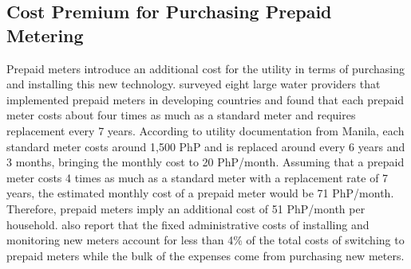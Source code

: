 \documentclass[12pt,table]{article}
\begin{document}
\begin{table}[H]
\end{table}





\subsection{Cost Premium for Purchasing Prepaid Metering}\label{appendix:prepaidcosts}

Prepaid meters introduce an additional cost for the utility in terms of purchasing and installing this new technology.  \cite{heymans2014limits} surveyed eight large water providers that implemented prepaid meters in developing countries and found that each prepaid meter costs about four times as much as a standard meter and requires replacement every 7 years.  According to utility documentation from Manila, each standard meter costs around 1,500 PhP and is replaced around every 6 years and 3 months, bringing the monthly cost to 20 PhP/month.  Assuming that a prepaid meter costs 4 times as much as a standard meter with a replacement rate of 7 years, the estimated monthly cost of a prepaid meter would be 71 PhP/month.  Therefore, prepaid meters imply an additional cost of 51 PhP/month per household.  \cite{heymans2014limits} also report that the fixed administrative costs of installing and monitoring new meters account for less than 4\% of the total costs of switching to prepaid meters while the bulk of the expenses come from purchasing new meters.  
\end{document}
